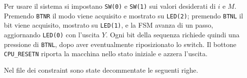 \sintesiboard

Per usare il sistema si impostano \texttt{SW(0)} e \texttt{SW(1)} sui valori desiderati di $i$ e $M$. Premendo \texttt{BTNR} il modo viene acquisito e mostrato su \texttt{LED(2)}; premendo \texttt{BTNL} il bit viene acquisito, mostrato su \texttt{LED(1)}, e la FSM avanza di un passo, aggiornando \texttt{LED(0)} con l'uscita $Y$. Ogni bit della sequenza richiede quindi una pressione di \texttt{BTNL}, dopo aver eventualmente riposizionato lo switch. Il bottone \texttt{CPU\_RESETN} riporta la macchina nello stato iniziale e azzera l'uscita.


Nel file dei constraint sono state decommentate le seguenti righe.

